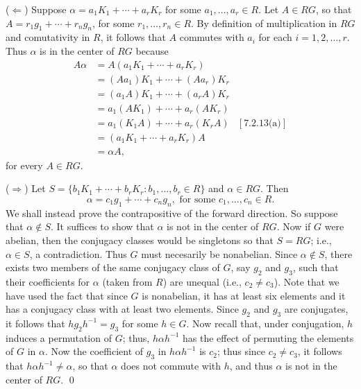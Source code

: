 \begin{enumerate}
\begin{enumerate}
               ($\Leftarrow$) Suppose $\alpha = a_1K_1 + \cdots + a_rK_r$ for
               some $a_1, \ldots, a_r \in R$. Let $A \in RG$, so that
               $A = r_1g_1 + \cdots +r_ng_n$, for some $r_1, \ldots, r_n \in R$.
               By definition of multiplication in $RG$ and comutativity in $R$,
               it follows that $A$ commutes with $a_i$ for each
               $i = 1, 2, \ldots, r$. Thus $\alpha$ is in the center of $RG$
               because
               \begin{align*}
                  A\alpha &= A(a_1K_1 + \cdots + a_rK_r) \\
                     &= (Aa_1)K_1 + \cdots + (Aa_r)K_r \\
                     &= (a_1A)K_1 + \cdots + (a_rA)K_r \\
                     &= a_1(AK_1) + \cdots + a_r(AK_r) \\
                     &= a_1(K_1A) + \cdots + a_r(K_rA) &[\text{7.2.13(a)}]\\
                     &= (a_1K_1 + \cdots + a_rK_r)A \\
                     &= \alpha A,
               \end{align*}
               for every $A \in RG$.

               ($\Rightarrow$) Let
               $S = \{b_1K_1 + \cdots + b_rK_r : b_1, \ldots, b_r \in R\}$ and
               $\alpha \in RG$. Then
               $$\alpha = c_1g_1 + \cdots + c_ng_n, \text{ for some }
                  c_1, \ldots, c_n \in R.$$
               We shall instead prove the contrapositive of the forward
               direction. So suppose that $\alpha \notin S$. It suffices to show
               that $\alpha$ is not in the center of $RG$. Now if $G$ were
               abelian, then the conjugacy classes would be singletons so that
               $S = RG$; i.e., $\alpha \in S$, a contradiction. Thus $G$ must
               necesarily be nonabelian. Since $\alpha \notin S$, there exists
               two members of the same conjugacy class of $G$, say $g_2$ and
               $g_3$, such that their coefficients for $\alpha$ (taken from $R$)
               are unequal (i.e., $c_2 \neq c_3$). Note that we have used the
               fact that since $G$ is nonabelian, it has at least six elements
               and it has a conjugacy class with at least two elements. Since
               $g_2$ and $g_3$ are conjugates, it follows that
               $hg_2h^{-1} = g_3$ for some $h \in G$. Now recall that, under
               conjugation, $h$ induces a permutation of $G$; thus,
               $h\alpha h^{-1}$ has the effect of permuting the elements of $G$
               in $\alpha$. Now the coefficient of $g_3$ in $h\alpha h^{-1}$ is
               $c_2$; thus since $c_2 \neq c_3$, it follows that
               $h\alpha h^{-1} \neq \alpha$, so that $\alpha$ does not commute
               with $h$, and thus $\alpha$ is not in the center of $RG$. \qed
      \end{enumerate}
\end{enumerate}
